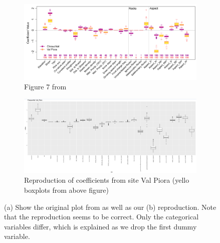 \documentclass[twoside,twocolumn]{article}
\begin{document}
\begin{figure}

    \centering

    \begin{subfigure}[b]{\textwidth}
       \includegraphics[width=1\textwidth]{orig_coef}
       \caption{Figure 7 from \cite{zweifel_samarin_meusburger_alewell_2021}}
       \label{fig:Ng1}
    \end{subfigure}

    \begin{subfigure}[b]{\textwidth}
       \includegraphics[width=1\textwidth]{rep_coef}
       \caption{Reproduction of coefficients from site Val Piora (yello boxplots from above figure)}
       \label{fig:Ng2}
    \end{subfigure}

    \caption[Two numerical solutions]{(a) Show the original plot from \cite{zweifel_samarin_meusburger_alewell_2021} as well as our (b) reproduction. Note that the reproduction seems to be correct. Only the categorical variables differ, which is explained as we drop the first dummy variable.}
    \label{fig:reproduction}
\end{figure}

\end{document}
